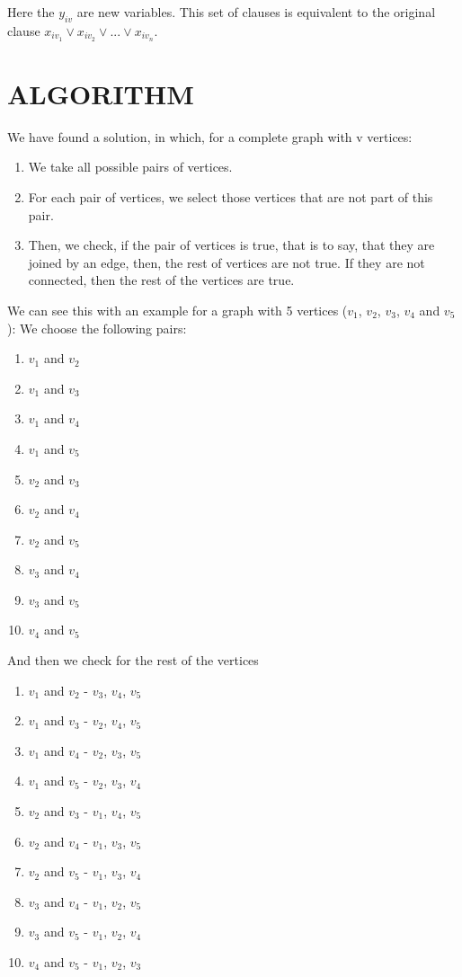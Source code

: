 \documentclass[table]{article}
\begin{document}
\leftskip=0.5in 
Here the $y_{iv}$ are new variables. This set of clauses is equivalent to the original clause $x_{iv_1} \lor x_{iv_2} \lor ... \lor x_{iv_n} $.

\leftskip=0.0in  
\section{ALGORITHM}

\leftskip=0.5in  
We have found a solution, in which, for a complete graph with v vertices:
\begin{enumerate}\leftskip=0.8in 
\item We take all possible pairs of vertices.
\item For each pair of vertices, we select those vertices that are not part of this pair.
\item Then, we check, if the pair of vertices is true, that is to say, that they are joined by an edge, then, the rest of vertices are not true. If they are not connected, then the rest of the vertices are true.
\end{enumerate}

We can see this with an example for a graph with 5 vertices ($v_1$, $v_2$, $v_3$, $v_4$ and $v_5$):
We choose the following pairs:

\begin{enumerate}\leftskip=0.8in 
\item $v_1$ and $v_2$
\item $v_1$ and $v_3$
\item $v_1$ and $v_4$
\item $v_1$ and $v_5$
\item $v_2$ and $v_3$
\item $v_2$ and $v_4$
\item $v_2$ and $v_5$
\item $v_3$ and $v_4$ 
\item $v_3$ and $v_5$
\item $v_4$ and $v_5$
\end{enumerate}

And then we check for the rest of the vertices
\begin{enumerate}\leftskip=0.8in 
\item $v_1$ and $v_2$ - $v_3$, $v_4$, $v_5$
\item $v_1$ and $v_3$ - $v_2$, $v_4$, $v_5$
\item $v_1$ and $v_4$ - $v_2$, $v_3$, $v_5$
\item $v_1$ and $v_5$ - $v_2$, $v_3$, $v_4$
\item $v_2$ and $v_3$ - $v_1$, $v_4$, $v_5$
\item $v_2$ and $v_4$ - $v_1$, $v_3$, $v_5$
\item $v_2$ and $v_5$ - $v_1$, $v_3$, $v_4$
\item $v_3$ and $v_4$ - $v_1$, $v_2$, $v_5$
\item $v_3$ and $v_5$ - $v_1$, $v_2$, $v_4$
\item $v_4$ and $v_5$ - $v_1$, $v_2$, $v_3$
\end{enumerate}
\end{document}
